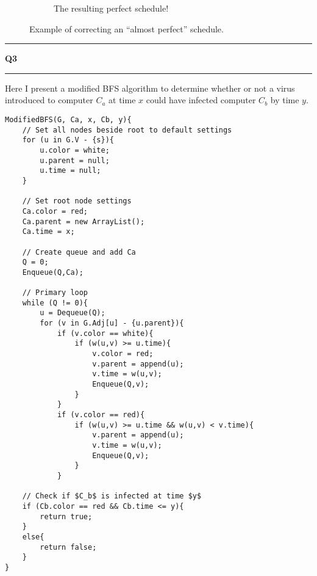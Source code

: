 \documentclass[11pt]{article}
\newcommand\question[2]{\vspace{.25in}\hrule\textbf{#1 #2}\vspace{.5em}\hrule\vspace{.10in}}
\begin{document}
\begin{figure*}[!htpb]
\begin{subfigure}[t]{0.5\textwidth}
\caption{The resulting perfect schedule!}
\end{subfigure}
\caption{Example of correcting an ``almost perfect'' schedule.}
\end{figure*}

\clearpage

\question{Q3}{}
Here I present a modified BFS algorithm to determine whether or not a virus introduced to computer $C_a$ at time $x$ could have infected computer $C_b$ by time $y$.
\begin{lstlisting}
ModifiedBFS(G, Ca, x, Cb, y){
	// Set all nodes beside root to default settings
	for (u in G.V - {s}){
		u.color = white;
		u.parent = null;
		u.time = null;
	}
	
	// Set root node settings
	Ca.color = red;
	Ca.parent = new ArrayList();
	Ca.time = x;
	
	// Create queue and add Ca
	Q = 0;
	Enqueue(Q,Ca);
	
	// Primary loop
	while (Q != 0){
		u = Dequeue(Q);
		for (v in G.Adj[u] - {u.parent}){
			if (v.color == white){
				if (w(u,v) >= u.time){
					v.color = red;
					v.parent = append(u);
					v.time = w(u,v);
					Enqueue(Q,v);
				}
			}
			if (v.color == red){
				if (w(u,v) >= u.time && w(u,v) < v.time){
					v.parent = append(u);
					v.time = w(u,v);
					Enqueue(Q,v);
				}
			}
	
	// Check if $C_b$ is infected at time $y$
	if (Cb.color == red && Cb.time <= y){
		return true;
	}
	else{
		return false;
	}
}		
\end{lstlisting}
\end{document}
